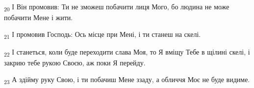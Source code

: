 \begin{tcolorbox}
\textsubscript{20} І Він промовив: Ти не зможеш побачити лиця Мого, бо людина не може побачити Мене і жити.
\end{tcolorbox}
\begin{tcolorbox}
\textsubscript{21} І промовив Господь: Ось місце при Мені, і ти станеш на скелі.
\end{tcolorbox}
\begin{tcolorbox}
\textsubscript{22} І станеться, коли буде переходити слава Моя, то Я вміщу Тебе в щілині скелі, і закрию тебе рукою Своєю, аж поки Я перейду.
\end{tcolorbox}
\begin{tcolorbox}
\textsubscript{23} А здійму руку Свою, і ти побачиш Мене ззаду, а обличчя Моє не буде видиме.
\end{tcolorbox}
